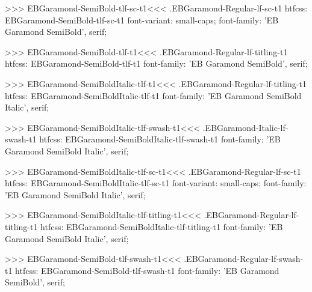 {{{{{{{>>>
\<EBGaramond-SemiBold-tlf-sc-t1\><<<
.EBGaramond-Regular-lf-sc-t1
htfcss:  EBGaramond-SemiBold-tlf-sc-t1  font-variant: small-caps; font-family: 'EB Garamond SemiBold', serif;

>>>
\<EBGaramond-SemiBold-tlf-t1\><<<
.EBGaramond-Regular-lf-titling-t1
htfcss:  EBGaramond-SemiBold-tlf-t1  font-family: 'EB Garamond SemiBold', serif;

>>>
\<EBGaramond-SemiBoldItalic-tlf-t1\><<<
.EBGaramond-Regular-lf-titling-t1
htfcss:  EBGaramond-SemiBoldItalic-tlf-t1  font-family: 'EB Garamond SemiBold Italic', serif;

>>>
\<EBGaramond-SemiBoldItalic-tlf-swash-t1\><<<
.EBGaramond-Italic-lf-swash-t1
htfcss:  EBGaramond-SemiBoldItalic-tlf-swash-t1  font-family: 'EB Garamond SemiBold Italic', serif;

>>>
\<EBGaramond-SemiBoldItalic-tlf-sc-t1\><<<
.EBGaramond-Regular-lf-sc-t1
htfcss:  EBGaramond-SemiBoldItalic-tlf-sc-t1  font-variant: small-caps; font-family: 'EB Garamond SemiBold Italic', serif;

>>>
\<EBGaramond-SemiBoldItalic-tlf-titling-t1\><<<
.EBGaramond-Regular-lf-titling-t1
htfcss:  EBGaramond-SemiBoldItalic-tlf-titling-t1  font-family: 'EB Garamond SemiBold Italic', serif;

>>>
\<EBGaramond-SemiBold-tlf-swash-t1\><<<
.EBGaramond-Regular-lf-swash-t1
htfcss:  EBGaramond-SemiBold-tlf-swash-t1  font-family: 'EB Garamond SemiBold', serif;

}}}}}}}
